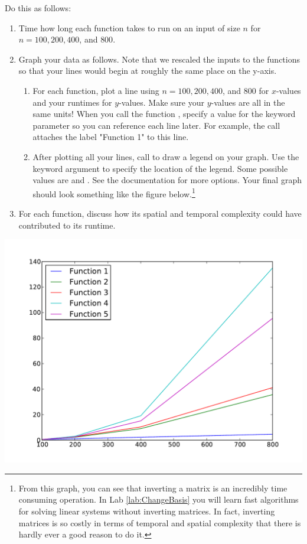 \begin{problem}
Do this as follows:
\begin{enumerate}
\item Time how long each function takes to run on an input of size $n$ for $n=100, 200, 400$, and $800$.
\item Graph your data as follows. Note that we rescaled the inputs to the functions so that your lines would begin at roughly the same place on the y-axis.
\begin{enumerate}
\item For each function, plot a line using $n=100, 200, 400$, and $800$ for $x$-values and your runtimes for $y$-values. Make sure your $y$-values are all in the same units! When you call the function , specify a value for the keyword parameter  so you can reference each line later. For example, the call  attaches the label "Function 1" to this line.
\item After plotting all your lines, call  to draw a legend on your graph. Use the keyword argument  to specify the location of the legend. Some possible values are  and . See the documentation for more options. Your final graph should look something like the figure below.\footnote{From this graph, you can see that inverting a matrix is an incredibly time consuming operation. In Lab \ref{lab:ChangeBasis} you will learn fast algorithms for solving linear systems without inverting matrices. In fact, inverting matrices is so costly in terms of temporal and spatial complexity that there is hardly ever a good reason to do it.}
\end{enumerate}
\item For each function, discuss how its spatial and temporal complexity could have contributed to its runtime.
\end{enumerate}


\centering
\includegraphics[width=\textwidth]{complexity_problem.pdf}

\end{problem}


